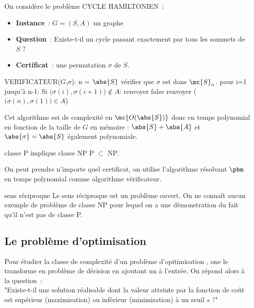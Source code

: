 \begin{exemple}{}{}
    On considère le problème CYCLE HAMILTONIEN~:
    \begin{itemize}
        \item \textbf{Instance}~: $G=(S,A)$ un graphe
        \item \textbf{Question}~: Existe-t-il un cycle passant exactement par tous les sommets de $S$ ?
        \item \textbf{Certificat}~: une permutation $\sigma$ de $S$.
    \end{itemize}
    \begin{lstLNat}
    VERIFICATEUR($G$,$\sigma$):
        n = $\abs{S}$
        vérifier que $\sigma$ est dans $\mc{S}_n$.
        pour i=1 jusqu'à n-1:
            Si $\Big(\sigma(i),\sigma(i+1)\Big) \notin A$:
                renvoyer false
        renvoyer ($\Big(\sigma(n),\sigma(1)\Big) \in A$)
    \end{lstLNat}
    Cet algorithme est de complexité en $\mc{O(\abs{S})}$ donc en temps polynomial en fonction de la taille de $G$ en mémoire : $\abs{S} + \abs{A}$ et $\abs{\sigma} = \abs{S}$ également polynomiale.
\end{exemple}

\begin{proposition}{}{classe P implique classe NP}
    P $\subset$ NP.
\end{proposition}

\begin{demonstration}
    On peut prendre n'importe quel certificat, on utilise l'algorithme résolvant $\pbm$ en temps polynomial comme algorithme vérificateur.
\end{demonstration}

\begin{remarque}{}{sens réciproque}
    Le sens réciproque est un problème ouvert. On ne connaît aucun exemple de problème de classe NP pour lequel on a une démonstration du fait qu'il n'est pas de classe P.
\end{remarque}

\subsection{Le problème d'optimisation}
Pour étudier la classe de complexité d'un problème d'opitimisation , one le transforme en problème de décision en ajoutant un  à l'entrée. On répond alors à la question~:\\
"Existe-t-il une solution réalisable dont la valeur atteinte par la fonction de coût est supérieur (maximisation) ou inférieur (minimisation) à un seuil $s$ ?"\\\\

